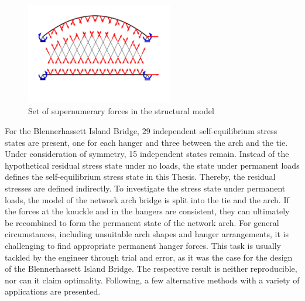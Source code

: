 \begin{figure}[H]
    \centering
    \includegraphics[trim={1cm 16cm 4cm 6.5cm},clip, width=0.57\textwidth]{overleaf/Pictures/Supernumerary forces.png}
    \caption{Set of supernumerary forces in the structural model}
    \label{fig:super_forces}
\end{figure}

For the Blennerhassett Island Bridge, 29 independent self-equilibrium stress states are present, one for each hanger and three between the arch and the tie. Under consideration of symmetry, 15 independent states remain. Instead of the hypothetical residual stress state under no loads, the state under permanent loads defines the self-equilibrium stress state in this Thesis. Thereby, the residual stresses are defined indirectly. 
To investigate the stress state under permanent loads, the model of the network arch bridge is split into the tie and the arch. If the forces at the knuckle and in the hangers are consistent, they can ultimately be recombined to form the permanent state of the network arch.
For general circumstances, including unsuitable arch shapes and hanger arrangements, it is challenging to find appropriate permanent hanger forces. This task is usually tackled by the engineer through trial and error, as it was the case for the design of the Blennerhassett Island Bridge. The respective result is neither reproducible, nor can it claim optimality. Following, a few alternative methods with a variety of applications are presented. 



